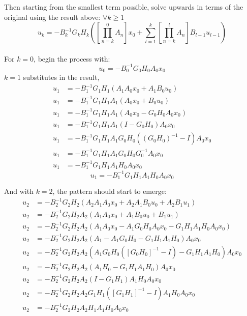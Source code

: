 \documentclass{article}
\begin{document}
Then starting from the smallest term possible, solve upwards in terms of the original using the result above: $\forall k \ge 1$
\[ u_{k} = - B_{k}^{-1} G_{k} H_{k} \left( \left[ \prod_{n = k}^{0} A_{n} \right]x_{0} + \sum_{l = 1}^{k} \left[ \prod_{n = k}^{l} A_{n} \right]B_{l-1}u_{l-1} \right) \]
\\
For $k=0$, begin the process with:
\[ \boxed{u_{0} = - B_{0}^{-1} G_{0} H_{0} A_{0} x_{0}} \]
$k=1$ substitutes in the result,
\begin{align*}
u_{1} &= - B_{1}^{-1} G_{1} H_{1} \left( A_{1} A_{0} x_{0} + A_{1} B_{0} u_{0} \right) \\
u_{1} &= - B_{1}^{-1} G_{1} H_{1} A_{1} \left( A_{0} x_{0} + B_{0} u_{0} \right) \\
u_{1} &= - B_{1}^{-1} G_{1} H_{1} A_{1} \left( A_{0} x_{0} - G_{0} H_{0} A_{0} x_{0} \right) \\
u_{1} &= - B_{1}^{-1} G_{1} H_{1} A_{1} \left( I - G_{0} H_{0} \right) A_{0} x_{0} \\
u_{1} &= - B_{1}^{-1} G_{1} H_{1} A_{1} G_{0} H_{0} \left( (G_{0} H_{0})^{-1} - I \right) A_{0} x_{0} \\
u_{1} &= - B_{1}^{-1} G_{1} H_{1} A_{1} G_{0} H_{0} G_{0}^{-1} A_{0} x_{0} \\
u_{1} &= - B_{1}^{-1} G_{1} H_{1} A_{1} H_{0} A_{0} x_{0}
\end{align*}
\[ \boxed{u_{1} = - B_{1}^{-1} G_{1} H_{1} A_{1} H_{0} A_{0} x_{0}} \]

And with $k=2$, the pattern should start to emerge:
\begin{align*}
u_{2} &= - B_{2}^{-1} G_{2} H_{2} \left( A_{2} A_{1} A_{0} x_{0} + A_{2} A_{1} B_{0} u_{0} + A_{2} B_{1} u_{1} \right) \\
u_{2} &= - B_{2}^{-1} G_{2} H_{2} A_{2} \left( A_{1} A_{0} x_{0} + A_{1} B_{0} u_{0} + B_{1} u_{1} \right) \\
u_{2} &= - B_{2}^{-1} G_{2} H_{2} A_{2} \left( A_{1} A_{0} x_{0} - A_{1} G_{0} H_{0} A_{0} x_{0}  - G_{1} H_{1} A_{1} H_{0} A_{0} x_{0} \right) \\
u_{2} &= - B_{2}^{-1} G_{2} H_{2} A_{2} \left( A_{1} - A_{1} G_{0} H_{0}  - G_{1} H_{1} A_{1} H_{0} \right) A_{0} x_{0} \\
u_{2} &= - B_{2}^{-1} G_{2} H_{2} A_{2} \left( A_{1} G_{0} H_{0}([G_{0} H_{0}]^{-1} - I) - G_{1} H_{1} A_{1} H_{0} \right) A_{0} x_{0} \\
u_{2} &= - B_{2}^{-1} G_{2} H_{2} A_{2} \left( A_{1} H_{0} - G_{1} H_{1} A_{1} H_{0} \right) A_{0} x_{0} \\
u_{2} &= - B_{2}^{-1} G_{2} H_{2} A_{2} \left( I - G_{1} H_{1} \right) A_{1} H_{0} A_{0} x_{0} \\
u_{2} &= - B_{2}^{-1} G_{2} H_{2} A_{2} G_{1} H_{1} \left( [G_{1} H_{1}]^{-1} - I \right) A_{1} H_{0} A_{0} x_{0} \\
u_{2} &= - B_{2}^{-1} G_{2} H_{2} A_{2} H_{1} A_{1} H_{0} A_{0} x_{0}
\end{align*}
\end{document}
